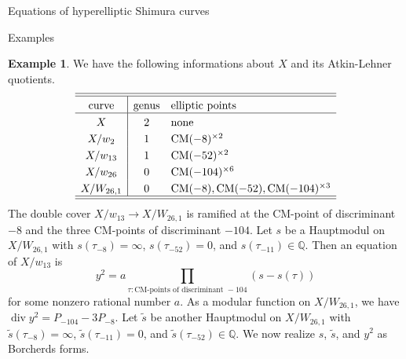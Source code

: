 \documentclass{amsart}
\newcounter{lemma}
\theoremstyle{definition}
\newtheorem{Example}[lemma]{Example}
\def\Q{\mathbb Q}
\def\CM{\mathrm{CM}}
\def\wt{\widetilde}
\def\div{\operatorname{div}}
\begin{document}
\begin{section}{Equations of hyperelliptic Shimura curves}
\begin{subsection}{Examples}
\begin{Example}
  We have the following informations about $X$ and its Atkin-Lehner
  quotients.
  $$ \extrarowheight3pt
  \begin{array}{c|cl} \hline\hline
  \text{curve} & \text{genus} & \text{elliptic points} \\ \hline
  X & 2 & \text{none} \\
  X/w_2 & 1 & \CM(-8)^{\times 2} \\
  X/w_{13} & 1 & \CM(-52)^{\times 2} \\
  X/w_{26} & 0 & \CM(-104)^{\times 6} \\
  X/W_{26,1} & 0 & \CM(-8),\CM(-52),\CM(-104)^{\times 3} \\
    \hline\hline
  \end{array}
  $$
  The double cover $X/w_{13}\to X/W_{26,1}$ is ramified at the
  CM-point of discriminant $-8$ and the three CM-points of
  discriminant $-104$. Let $s$ be a Hauptmodul on $X/W_{26,1}$
  with $s(\tau_{-8})=\infty$, $s(\tau_{-52})=0$, and
  $s(\tau_{-11})\in\Q$. Then an equation of $X/w_{13}$ is
  $$
    y^2=a\prod_{\tau:\CM\text{-points of discriminant }-104}(s-s(\tau))
  $$
  for some nonzero rational number $a$. As a modular function on
  $X/W_{26,1}$, we have $\div y^2=P_{-104}-3P_{-8}$. Let $\wt s$ be
  another Hauptmodul on $X/W_{26,1}$ with $\wt
  s(\tau_{-8})=\infty$, $\wt s(\tau_{-11})=0$, and $\wt
  s(\tau_{-52})\in\Q$. We now realize $s$, $\wt s$, and $y^2$ as
  Borcherds forms.


\end{Example}
\end{subsection}
\end{section}
\end{document}
